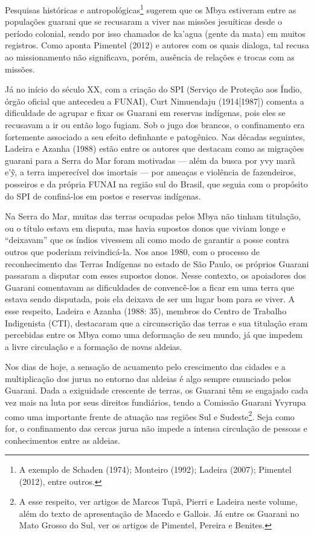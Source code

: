 Pesquisas históricas e antropológicas\footnote{A exemplo de Schaden
(1974); Monteiro (1992); Ladeira (2007); Pimentel (2012), entre
outros.} sugerem que os Mbya estiveram entre as populações guarani que
se recusaram a viver nas missões jesuíticas desde o período colonial,
sendo por isso chamados de ka’agua (gente da mata) em muitos registros.
Como aponta Pimentel (2012) e autores com os quais dialoga, tal recusa
ao missionamento não significava, porém, ausência de relações e trocas
com as missões.

Já no início do século XX, com a criação do SPI (Serviço de Proteção aos
Índio, órgão oficial que antecedeu a FUNAI), Curt Nimuendaju
(1914[1987]) comenta a dificuldade de agrupar e fixar os Guarani em
reservas indígenas, pois eles se recusavam a ir ou então logo fugiam.
Sob o jugo dos brancos, o confinamento era fortemente associado a seu
efeito definhante e patogênico. Nas décadas seguintes, Ladeira e Azanha
(1988) estão entre os autores que destacam como as migrações guarani
para a Serra do Mar foram motivadas — além da busca por yvy marã
e’\~{y}, a terra imperecível dos imortais — por ameaças e violência de
fazendeiros, posseiros e da própria FUNAI na região sul do Brasil, que
seguia com o propósito do SPI de confiná-los em postos e reservas
indígenas.

Na Serra do Mar, muitas das terras ocupadas pelos Mbya não tinham
titulação, ou o título estava em disputa, mas havia supostos donos que
viviam longe e ``deixavam'' que os índios vivessem ali como modo de
garantir a posse contra outros que poderiam reivindicá-la. Nos anos
1980, com o processo de reconhecimento das Terras Indígenas no estado
de São Paulo, os próprios Guarani passaram a disputar com esses
supostos donos. Nesse contexto, os apoiadores dos Guarani comentavam as
dificuldades de convencê-los a ficar em uma terra que estava sendo
disputada, pois ela deixava de ser um lugar bom para se viver. A esse
respeito, Ladeira e Azanha (1988: 35), membros do Centro de Trabalho
Indigenista (CTI), destacaram que a circunscrição das terras e sua
titulação eram percebidas entre os Mbya como uma deformação de seu
mundo, já que impedem a livre circulação e a formação de novas aldeias.

Nos dias de hoje, a sensação de acuamento pelo crescimento das cidades e
a multiplicação dos jurua no entorno das aldeias é algo sempre
enunciado pelos Guarani. Dada a exiguidade crescente de terras, os
Guarani têm se engajado cada vez mais na luta por seus direitos
fundiários, tendo a Comissão Guarani Yvyrupa como uma importante frente
de atuação nas regiões Sul e Sudeste\footnote{A esse respeito, ver
artigos de Marcos Tupã, Pierri e Ladeira neste volume, além do texto de
apresentação de Macedo e Gallois. Já entre os Guarani no Mato Grosso do
Sul, ver os artigos de Pimentel, Pereira e Benites.}. Seja como for, o
confinamento das cercas jurua não impede a intensa circulação de
pessoas e conhecimentos entre as aldeias. 

